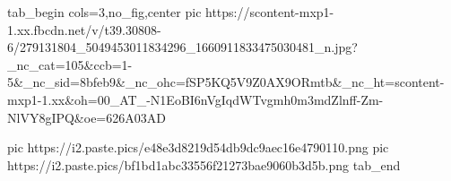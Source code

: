  
 
 
 
 

\ifcmt
  tab_begin cols=3,no_fig,center
     pic https://scontent-mxp1-1.xx.fbcdn.net/v/t39.30808-6/279131804_5049453011834296_1660911833475030481_n.jpg?_nc_cat=105&ccb=1-5&_nc_sid=8bfeb9&_nc_ohc=fSP5KQ5V9Z0AX9ORmtb&_nc_ht=scontent-mxp1-1.xx&oh=00_AT_-N1EoBI6nVgIqdWTvgmh0m3mdZlnff-Zm-NlVY8gIPQ&oe=626A03AD

		 pic https://i2.paste.pics/e48e3d8219d54db9dc9aec16e4790110.png
		 pic https://i2.paste.pics/bf1bd1abc33556f21273bae9060b3d5b.png
  tab_end
\fi
